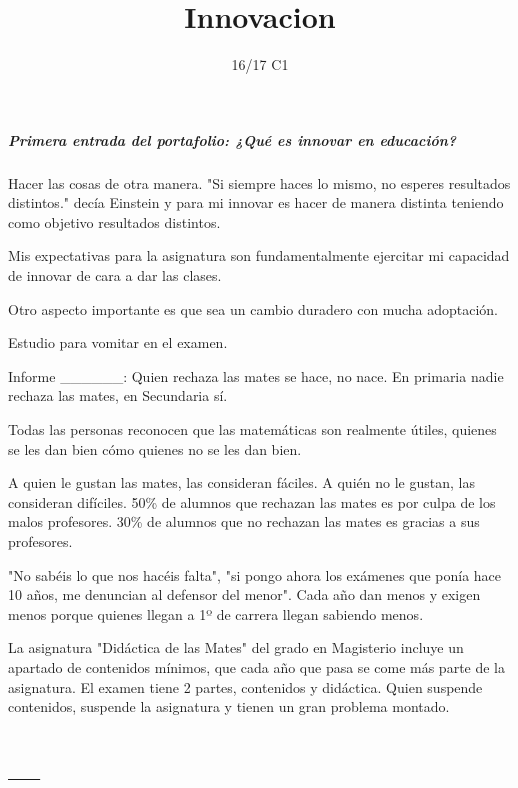 \documentclass[palatino]{apuntes}
\title{Innovacion}
\author{}
\date{16/17 C1}
\begin{document}
\pagestyle{plain}
\maketitle

\tableofcontents
\newpage

\paragraph{Primera entrada del portafolio: ¿Qué es innovar en educación?}

Hacer las cosas de otra manera. "Si siempre haces lo mismo, no esperes resultados distintos." decía Einstein y para mi innovar es hacer de manera distinta teniendo como objetivo resultados distintos.

Mis expectativas para la asignatura son fundamentalmente ejercitar mi capacidad de innovar de cara a dar las clases. 


Otro aspecto importante es que sea un cambio duradero con mucha adoptación.

\begin{defn}
Estudio para vomitar en el examen.
\end{defn}


Informe ______:
Quien rechaza las mates se hace, no nace. En primaria nadie rechaza las mates, en Secundaria sí.

Todas las personas reconocen que las matemáticas son realmente útiles, quienes se les dan bien cómo quienes no se les dan bien.

A quien le gustan las mates, las consideran fáciles. A quién no le gustan, las consideran difíciles. 50\% de alumnos que rechazan las mates es por culpa de los malos profesores. 30\% de alumnos que no rechazan las mates es gracias a sus profesores. 

"No sabéis lo que nos hacéis falta", "si pongo ahora los exámenes que ponía hace 10 años, me denuncian al defensor del menor". Cada año dan menos y exigen menos porque quienes llegan a 1º de carrera llegan sabiendo menos.

La asignatura "Didáctica de las Mates" del grado en Magisterio incluye un apartado de contenidos mínimos, que cada año que pasa se come más parte de la asignatura. 
%
El examen tiene 2 partes, contenidos y didáctica. Quien suspende contenidos, suspende la asignatura y tienen un gran problema montado.

\appendix

\chapter{---}


\printindex
\end{document}
